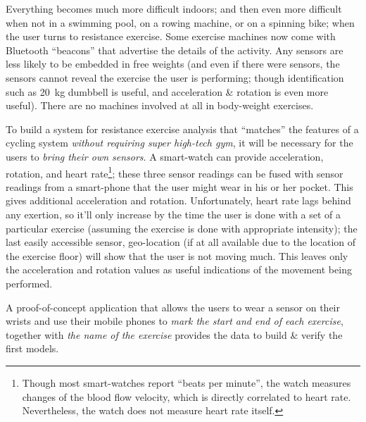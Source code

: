 
Everything becomes much more difficult indoors; and then even more difficult when not in a swimming pool, on a rowing machine, or on a spinning bike; when the user turns to resistance exercise. Some exercise machines now come with Bluetooth ``beacons'' that advertise the details of the activity. Any sensors are less likely to be embedded in free weights (and even if there were sensors, the sensors cannot reveal the exercise the user is performing; though identification such as \SI{20}{\kg} dumbbell is useful, and acceleration \& rotation is even more useful). There are no machines involved at all in body-weight exercises. 

To build a system for resistance exercise analysis that ``matches'' the features of a cycling system \emph{without requiring super high-tech gym}, it will be necessary for the users to \emph{bring their own sensors}. A smart-watch can provide acceleration, rotation, and heart rate\footnote{Though most smart-watches report ``beats per minute'', the watch measures changes of the blood flow velocity, which is directly correlated to heart rate. Nevertheless, the watch does not measure heart rate itself.}; these three sensor readings can be fused with sensor readings from a smart-phone that the user might wear in his or her pocket. This gives additional acceleration and rotation. Unfortunately, heart rate lags behind any exertion, so it'll only increase by the time the user is done with a set of a particular exercise (assuming the exercise is done with appropriate intensity); the last easily accessible sensor, geo-location (if at all available due to the location of the exercise floor) will show that the user is not moving much. This leaves only the acceleration and rotation values as useful indications of the movement being performed. 

A proof-of-concept application that allows the users to wear a sensor on their wrists and use their mobile phones to \emph{mark the start and end of each exercise}, together with \emph{the name of the exercise} provides the data to build \& verify the first models. 


